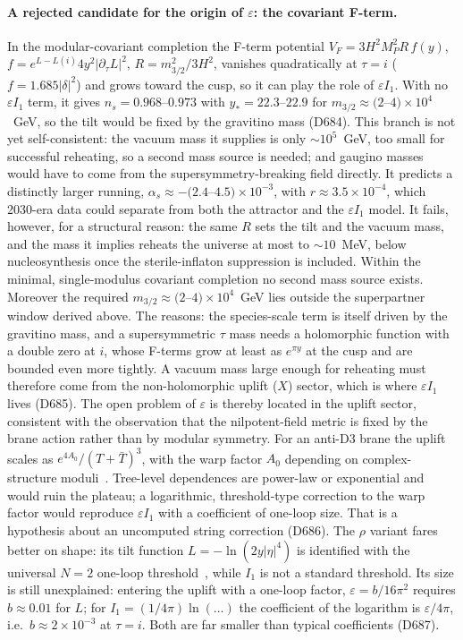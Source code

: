 \documentclass[aps,prd,twocolumn,superscriptaddress,nofootinbib,floatfix]{revtex4-2}
\begin{document}
\paragraph{A rejected candidate for the origin of $\varepsilon$: the covariant F-term.} In the modular-covariant completion the F-term potential $V_F=3H^2M_P^2R\,f(y)$, $f=e^{L-L(i)}4y^2|\partial_\tau L|^2$, $R=m_{3/2}^2/3H^2$, vanishes quadratically at $\tau=i$ ($f=1.685|\delta|^2$) and grows toward the cusp, so it can play the role of $\varepsilon I_1$. With no $\varepsilon I_1$ term, it gives $n_s=0.968$--$0.973$ with $y_*=22.3$--$22.9$ for $m_{3/2}\approx(2$--$4)\times10^4$~GeV, so the tilt would be fixed by the gravitino mass (D684). This branch is not yet self-consistent: the vacuum mass it supplies is only $\sim10^5$~GeV, too small for successful reheating, so a second mass source is needed; and gaugino masses would have to come from the supersymmetry-breaking field directly. It predicts a distinctly larger running, $\alpha_s\approx-(2.4$--$4.5)\times10^{-3}$, with $r\approx3.5\times10^{-4}$, which 2030-era data could separate from both the attractor and the $\varepsilon I_1$ model. It fails, however, for a structural reason: the same $R$ sets the tilt and the vacuum mass, and the mass it implies reheats the universe at most to $\sim10$~MeV, below nucleosynthesis once the sterile-inflaton suppression is included. Within the minimal, single-modulus covariant completion no second mass source exists. Moreover the required $m_{3/2}\approx(2$--$4)\times10^4$~GeV lies outside the superpartner window derived above. The reasons: the species-scale term is itself driven by the gravitino mass, and a supersymmetric $\tau$ mass needs a holomorphic function with a double zero at $i$, whose F-terms grow at least as $e^{\pi y}$ at the cusp and are bounded even more tightly. A vacuum mass large enough for reheating must therefore come from the non-holomorphic uplift ($X$) sector, which is where $\varepsilon I_1$ lives (D685). The open problem of $\varepsilon$ is thereby located in the uplift sector, consistent with the observation that the nilpotent-field metric is fixed by the brane action rather than by modular symmetry. For an anti-D3 brane the uplift scales as $e^{4A_0}/(T+\bar T)^3$, with the warp factor $A_0$ depending on complex-structure moduli~\cite{arXiv_1707_07059}. Tree-level dependences are power-law or exponential and would ruin the plateau; a logarithmic, threshold-type correction to the warp factor would reproduce $\varepsilon I_1$ with a coefficient of one-loop size. That is a hypothesis about an uncomputed string correction (D686). The $\rho$ variant fares better on shape: its tilt function $L=-\ln(2y|\eta|^4)$ is identified with the universal $N=2$ one-loop threshold~\cite{DKL1991,arXiv_hep-th_9510182}, while $I_1$ is not a standard threshold. Its size is still unexplained: entering the uplift with a one-loop factor, $\varepsilon=b/16\pi^2$ requires $b\approx0.01$ for $L$; for $I_1=(1/4\pi)\ln(\dots)$ the coefficient of the logarithm is $\varepsilon/4\pi$, i.e.\ $b\approx2\times10^{-3}$ at $\tau=i$. Both are far smaller than typical coefficients (D687).
\end{document}
